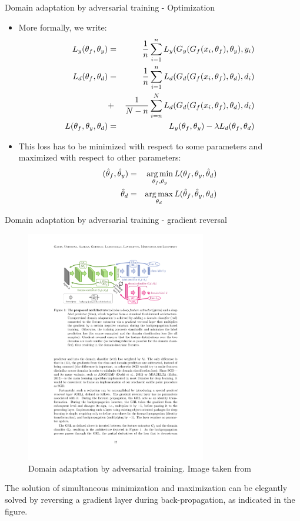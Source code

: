 \documentclass[xcolor=pdftex,dvipsnames,table]{beamer}
\begin{document}
\begin{frame}{Domain adaptation by adversarial training - Optimization}
\begin{itemize}
   \item More formally, we write:
\begin{eqnarray*}
L_y(\theta_f, \theta_y) &=& \frac{1}{n} \sum_{i=1}^n L_y(G_y(G_f(x_i,\theta_f), \theta_y), y_i) \\
L_d(\theta_f, \theta_d) &=& \frac{1}{n} \sum_{i=1}^n L_d(G_d(G_f(x_i,\theta_f), \theta_d), d_i) \\
&+& \frac{1}{N-n} \sum_{i=n}^NL_d(G_d(G_f(x_i,\theta_f), \theta_d), d_i) \\
L(\theta_f, \theta_y, \theta_d) &=& L_y(\theta_f, \theta_y) - \lambda L_d(\theta_f, \theta_d) 
\end{eqnarray*}
\item This loss has to be minimized with respect to some parameters and maximized with respect to other parameters:
\begin{eqnarray*}
(\hat{\theta}_f, \hat{\theta}_y) &=& \operatorname*{arg\,min}_{\theta_f, \theta_y} L(\theta_f, \theta_y, \hat{\theta}_d) \\
\hat{\theta}_d &=& \operatorname*{arg\,max}_{\theta_d} L(\hat{\theta}_f, \hat{\theta}_y, \theta_d) \\
\end{eqnarray*}
\end{itemize}
\end{frame}

\begin{frame}{Domain adaptation by adversarial training - gradient reversal}
\begin{figure}[htb]
   \centering
   \includegraphics[width=0.7\textwidth]{../graphics/domain_adaptation.pdf}
   \caption{Domain adaptation by adversarial training. Image taken from \cite{Ganin2016}}
\end{figure}
The solution of simultaneous minimization and maximization can be elegantly solved by reversing a gradient layer during back-propagation, as indicated in the figure. 
\end{frame}
\end{document}
